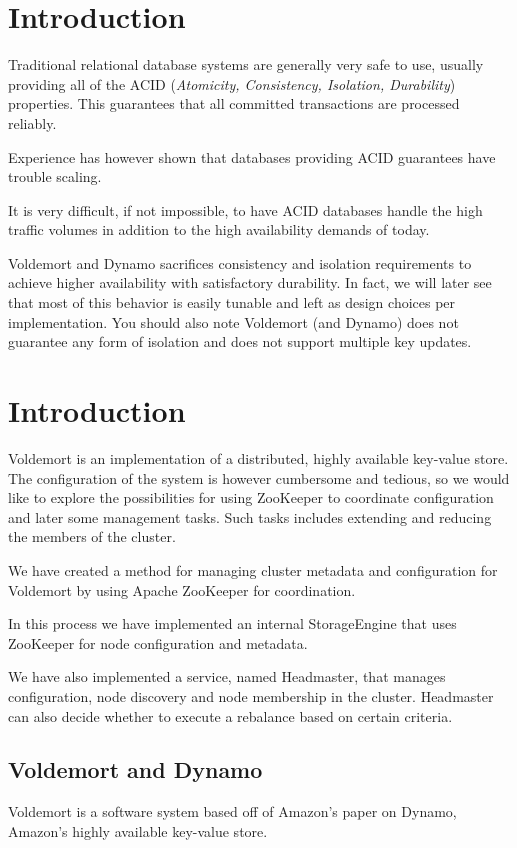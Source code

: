 

\section{Introduction}
Traditional relational database systems are generally very safe to use, usually providing all of the ACID (\emph{Atomicity, Consistency, Isolation, Durability}) properties.
This guarantees that all committed transactions are processed reliably.


Experience has however shown that databases providing ACID guarantees have trouble scaling. 


It is very difficult, if not impossible, to have ACID databases handle the high traffic volumes in addition to the high availability demands of today.

Voldemort and Dynamo sacrifices consistency and isolation requirements to achieve higher availability with satisfactory durability.
In fact, we will later see that most of this behavior is easily tunable and left as design choices per implementation.
You should also note Voldemort (and Dynamo) does not guarantee any form of isolation and does not support multiple key updates.


\section{Introduction}
Voldemort is an implementation of a distributed, highly available key-value store.
The configuration of the system is however cumbersome and tedious, so we would like to explore the possibilities for using ZooKeeper to coordinate configuration and later some management tasks.
Such tasks includes extending and reducing the members of the cluster.

We have created a method for managing cluster metadata and configuration for Voldemort by using Apache ZooKeeper for coordination.

In this process we have implemented an internal StorageEngine that uses ZooKeeper for node configuration and metadata.

We have also implemented a service, named Headmaster, that manages configuration, node discovery and node membership in the cluster.
Headmaster can also decide whether to execute a rebalance based on certain criteria.

\subsection{Voldemort and Dynamo}
Voldemort is a software system based off of Amazon's paper on Dynamo, Amazon's highly available key-value store\cite{dynamo}.

